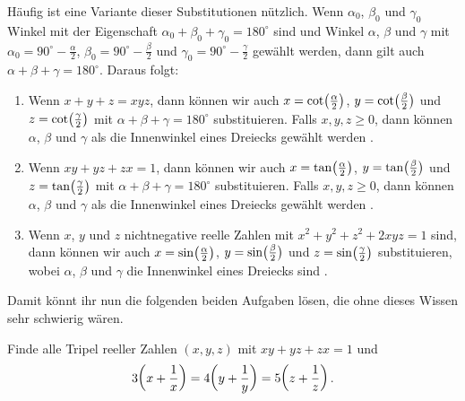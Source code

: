 Häufig ist eine Variante dieser Substitutionen nützlich. Wenn $\alpha_0$, $\beta_0$ und $\gamma_0$ Winkel mit der Eigenschaft $\alpha_0+\beta_0+\gamma_0=180^\circ$ sind und Winkel $\alpha$, $\beta$ und $\gamma$ mit $\alpha_0=90^\circ-\frac\alpha2$, $\beta_0=90^\circ-\frac\beta2$ und $\gamma_0=90^\circ-\frac\gamma2$ gewählt werden, dann gilt auch $\alpha+\beta+\gamma=180^\circ$. Daraus folgt:
\begin{enumerate}[label={$(\alph*)$},ref={$(\alph*)$}]\itshape
	\item Wenn $x+y+z=xyz$, dann können wir auch $x=\cot\parens[\big]{\frac{\alpha}2}$, $y=\cot\parens[\big]{\frac{\beta}2}$ und $z=\cot\parens[\big]{\frac{\gamma}2}$ mit $\alpha+\beta+\gamma=180^\circ$ substituieren. Falls $x,y,z\geqslant 0$, dann können $\alpha$, $\beta$ und $\gamma$ als die Innenwinkel eines Dreiecks gewählt werden .
	\item Wenn $xy+yz+zx=1$, dann können wir auch $x=\tan\parens[\big]{\frac{\alpha}2}$, $y=\tan\parens[\big]{\frac{\beta}2}$ und $z=\tan\parens[\big]{\frac{\gamma}2}$ mit $\alpha+\beta+\gamma=180^\circ$ substituieren. Falls $x,y,z\geqslant 0$, dann können $\alpha$, $\beta$ und $\gamma$ als die Innenwinkel eines Dreiecks gewählt werden .
	\item Wenn $x$, $y$ und $z$ nichtnegative reelle Zahlen mit $x^2+y^2+z^2+2xyz=1$ sind, dann können wir auch $x=\sin\parens[\big]{\frac{\alpha}2}$, $y=\sin\parens[\big]{\frac{\beta}2}$ und $z=\sin\parens[\big]{\frac{\gamma}2}$ substituieren, wobei $\alpha$, $\beta$ und $\gamma$ die Innenwinkel eines Dreiecks sind .
\end{enumerate}
Damit könnt ihr nun die folgenden beiden Aufgaben lösen, die ohne dieses Wissen sehr schwierig wären.%
\begin{aufgabe*}\label{aufgabe:521236}
	Finde alle Tripel reeller Zahlen $(x,y,z)$ mit $xy+yz+zx=1$ und
	\begin{equation*}
		3\parens*{x+\frac 1x}=4\parens*{y+\frac 1y}=5\parens*{z+\frac 1z}\,.
	\end{equation*}
\end{aufgabe*}
